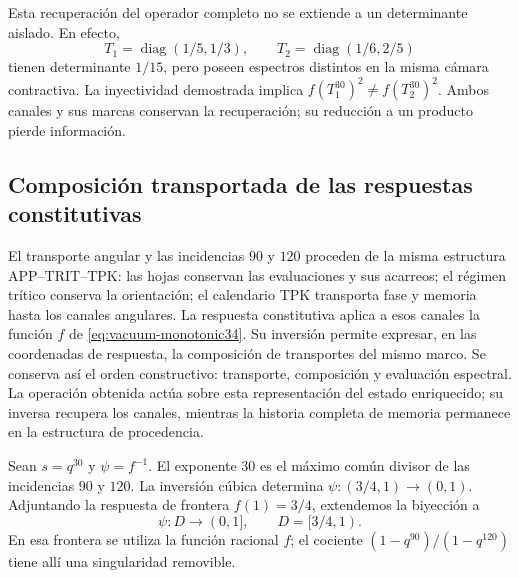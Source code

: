 Esta recuperación del operador completo no se extiende a un determinante
aislado. En efecto,
\[
 T_1=\operatorname{diag}(1/5,1/3),\qquad
 T_2=\operatorname{diag}(1/6,2/5)
\]
tienen determinante \(1/15\), pero poseen espectros distintos en la misma
cámara contractiva. La inyectividad demostrada implica
\(f(T_1^{30})^2\ne f(T_2^{30})^2\). Ambos canales y sus marcas
conservan la recuperación; su reducción a un producto pierde información.

\subsection{Composición transportada de las respuestas constitutivas}
\label{cr28:comp-sec}

El transporte angular y las incidencias $90$ y $120$ proceden de la
misma estructura APP--TRIT--TPK: las hojas conservan las evaluaciones y
sus acarreos; el régimen trítico conserva la orientación; el calendario
TPK transporta fase y memoria hasta los canales angulares. La respuesta
constitutiva aplica a esos canales la función $f$ de
\eqref{eq:vacuum-monotonic34}. Su inversión permite expresar, en las coordenadas
de respuesta, la composición de transportes del mismo marco. Se conserva
así el orden constructivo: transporte, composición y evaluación espectral.
La operación obtenida actúa sobre esta representación del estado enriquecido;
su inversa recupera los canales, mientras la historia completa de memoria
permanece en la estructura de procedencia.

Sean $s=q^{30}$ y $\psi=f^{-1}$. El exponente $30$ es el máximo común
divisor de las incidencias $90$ y $120$. La inversión cúbica determina
$\psi:(3/4,1)\longrightarrow(0,1)$. Adjuntando la respuesta de frontera
$f(1)=3/4$, extendemos la biyección a
\[
 \psi:D\longrightarrow(0,1],\qquad D=[3/4,1).
\]
En esa frontera se utiliza la función racional $f$; el cociente
$(1-q^{90})/(1-q^{120})$ tiene allí una singularidad removible.

